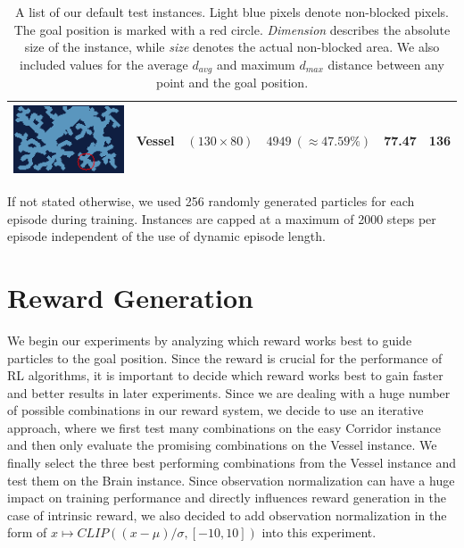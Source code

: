 \begin{table} [h!]
\begin{center}
\begin{tabular}{|c|c|c|c|c|c|}
            \parbox[c]{3.5cm}{\includegraphics[clip, width=3.5cm]{figures/evaluation/procedure/vessel_upscaled.png}} & Vessel & $(130 \times 80)$ & $4949 \ (\approx 47.59\%)$ & 77.47 & 136 \\[1cm]
            \hline
        \end{tabular}
    \end{center}
    \caption[Test Instances]{A list of our default test instances. Light blue pixels denote non-blocked pixels. The goal position is marked with a red circle. \textit{Dimension} describes the absolute size of the instance, while \textit{size} denotes the actual non-blocked area. We also included values for the average $d_{avg}$ and maximum $d_{max}$ distance between any point and the goal position.} \label{tab:TestInstances}
\end{table}

If not stated otherwise, we used 256 randomly generated particles for each episode during training. Instances are capped at a maximum of 2000 steps per episode independent of the use of dynamic episode length.

\section{Reward Generation} \label{sec:EvalReward}
We begin our experiments by analyzing which reward works best to guide particles to the goal position. Since the reward is crucial for the performance of RL algorithms, it is important to decide which reward works best to gain faster and better results in later experiments. Since we are dealing with a huge number of possible combinations in our reward system, we decide to use an iterative approach, where we first test many combinations on the easy Corridor instance and then only evaluate the promising combinations on the Vessel instance. We finally select the three best performing combinations from the Vessel instance and test them on the Brain instance. Since observation normalization can have a huge impact on training performance and directly influences reward generation in the case of intrinsic reward, we also decided to add observation normalization in the form of $x \mapsto CLIP((x - \mu)/\sigma, [-10, 10])$ into this experiment.

